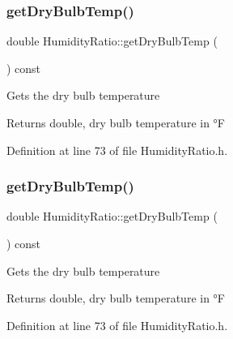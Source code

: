 \subsubsection{\texorpdfstring{get\+Dry\+Bulb\+Temp()}{getDryBulbTemp()}\hspace{0.1cm}{\footnotesize\ttfamily [2/3]}}
{\footnotesize\ttfamily double Humidity\+Ratio\+::get\+Dry\+Bulb\+Temp (\begin{DoxyParamCaption}{ }\end{DoxyParamCaption}) const\hspace{0.3cm}{\ttfamily [inline]}}

Gets the dry bulb temperature

\begin{DoxyReturn}{Returns}
double, dry bulb temperature in °F 
\end{DoxyReturn}


Definition at line 73 of file Humidity\+Ratio.\+h.

\mbox{\label{class_humidity_ratio_a737b2faf32e5271b8062b175e1d018a9}} 
\subsubsection{\texorpdfstring{get\+Dry\+Bulb\+Temp()}{getDryBulbTemp()}\hspace{0.1cm}{\footnotesize\ttfamily [3/3]}}
{\footnotesize\ttfamily double Humidity\+Ratio\+::get\+Dry\+Bulb\+Temp (\begin{DoxyParamCaption}{ }\end{DoxyParamCaption}) const\hspace{0.3cm}{\ttfamily [inline]}}

Gets the dry bulb temperature

\begin{DoxyReturn}{Returns}
double, dry bulb temperature in °F 
\end{DoxyReturn}


Definition at line 73 of file Humidity\+Ratio.\+h.

\mbox{\label{class_humidity_ratio_af711463f09fa91544c2b69dc24817fed}} 
